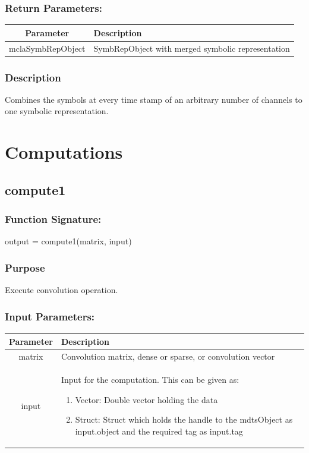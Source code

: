 \documentclass[a4]{scrreprt}
\begin{document}
\subsubsection{Return Parameters:}

\begin{longtabu} to \textwidth {|c|X|}
	\hline
	\textbf{Parameter} & \textbf{Description} \\ \hline
	\endhead
	mclaSymbRepObject  &  SymbRepObject with merged symbolic representation \\ \hline
\end{longtabu}

\subsubsection{Description}

Combines the symbols at every time stamp of an arbitrary number of channels to one symbolic representation.

\section{Computations}

\subsection{compute1}
\label{Chpcompute1Fct}

\subsubsection{Function Signature:}

\begin{center}
	output = compute1(matrix, input)
\end{center}

\subsubsection{Purpose}

Execute convolution operation.

\subsubsection{Input Parameters:}

\begin{longtabu} to \textwidth {|c|X|}
	\hline
	\textbf{Parameter} & \textbf{Description} \\ \hline
	\endhead
	matrix & Convolution matrix, dense or sparse, or convolution vector \\ \hline
	input & Input for the computation. This can be given as:
			\begin{enumerate}
				\item Vector: Double vector holding the data
				\item Struct: Struct which holds the handle to the mdtsObject as input.object and the required tag as input.tag 
			\end{enumerate} \\ \hline
\end{longtabu}
\end{document}
